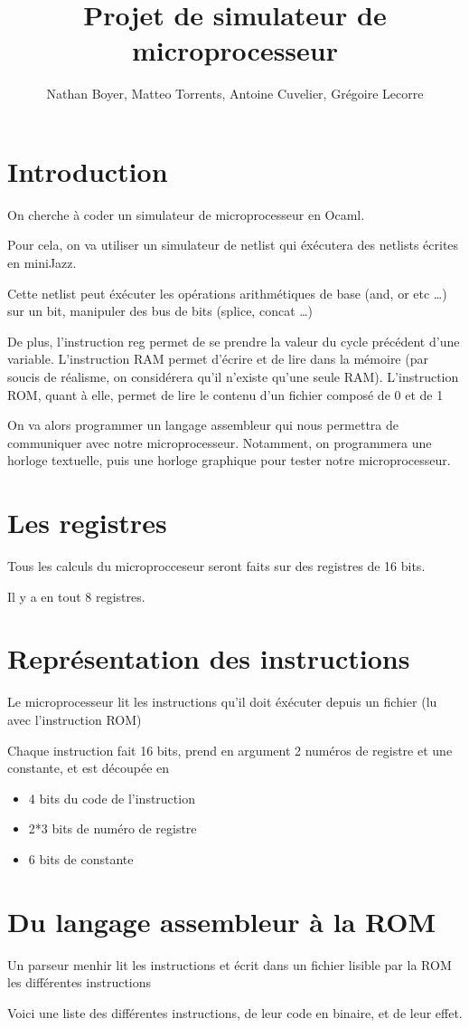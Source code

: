 \documentclass[12pt,a4paper,french]{article}
\title{Projet de simulateur de microprocesseur}
\author{Nathan Boyer, Matteo Torrents, Antoine Cuvelier, Grégoire Lecorre}
\begin{document}
\maketitle

\section*{Introduction}

On cherche à coder un simulateur de microprocesseur en Ocaml.

Pour cela, on va utiliser un simulateur de netlist qui éxécutera des netlists écrites en miniJazz.

Cette netlist peut éxécuter les opérations arithmétiques de base (and, or etc \ldots) sur un bit, manipuler des bus de bits (splice, concat \ldots)

De plus, l'instruction reg permet de se prendre la valeur du cycle précédent d'une variable. L'instruction RAM permet d'écrire et de lire dans la mémoire
(par soucis de réalisme, on considérera qu'il n'existe qu'une seule RAM). L'instruction ROM, quant à elle, permet de lire le contenu d'un fichier composé de 0 et de 1

On va alors programmer un langage assembleur qui nous permettra de communiquer avec notre microprocesseur. Notamment, on programmera une horloge textuelle, puis une horloge graphique
pour tester notre microprocesseur.


\section{Les registres}

Tous les calculs du microprocceseur seront faits sur des registres de 16 bits.

Il y a en tout 8 registres.


\section{Représentation des instructions}

Le microprocesseur lit les instructions qu'il doit éxécuter depuis un fichier (lu avec l'instruction ROM)

Chaque instruction fait 16 bits, prend en argument 2 numéros de registre et une constante, et est découpée en

\begin{itemize}
    \item 4 bits du code de l'instruction
    \item 2*3 bits de numéro de registre
    \item 6 bits de constante
\end{itemize}


\section{Du langage assembleur à la ROM}

Un parseur menhir lit les instructions et écrit dans un fichier lisible par la ROM les différentes instructions

Voici une liste des différentes instructions, de leur code en binaire, et de leur effet.
\end{document}
